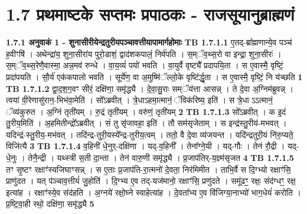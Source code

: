 \documentclass[17pt]{extarticle}
\begin{document}
     \section*{ 1.7     प्रथमाष्टके सप्तमः प्रपाठकः - राजसूयानुब्राह्मणं }
                \textbf{ 1.7.1     अनुवाकं   1 - शुनासीरीयेन्द्रतुरीयपञ्चावत्तीयापामार्गहोमाः} \newline
                                \textbf{ TB 1.7.1.1} \newline
                  ए॒तद्-ब्रा᳚ह्मणान्ये॒व पञ्च॑ ह॒वीꣳषि॑ । अथेन्द्रा॑य॒ शुना॒सीरा॑य पुरो॒डाशं॒ द्वाद॑शकपालं॒ निर्व॑पति । स॒म्ॅव॒थ्स॒रो वा इन्द्रा॒ शुना॒सीरः॑ । स॒म्ॅव॒थ्स॒रेणै॒वास्मा॒ अन्न॒मव॑ रुन्धे । वा॒य॒व्यं॑ पयो॑ भवति । वा॒युर्वै वृष्ट्यै᳚ प्रदापयि॒ता । स ए॒वास्मै॒ वृष्टिं॒ प्रदा॑पयति । सौ॒र्य॑ एक॑कपालो भवति । सूर्ये॑ण॒ वा अ॒मुष्मि॑ॅल्लो॒के वृष्टि॑र्द्धृ॒ता । स ए॒वास्मै॒ वृष्टिं॒ नि य॑च्छति \textbf{ 1} \newline
                  \newline
                                \textbf{ TB 1.7.1.2} \newline
                  द्वा॒द॒श॒ग॒वꣳ सीरं॒ दक्षि॑णा॒ समृ॑द्ध्यै । दे॒वा॒सु॒राः सम्ॅय॑त्ता आसन्न् । ते दे॒वा अ॒ग्निम॑ब्रुवन्न् । त्वया॑ वी॒रेणासु॑रान॒-भिभ॑वा॒मेति॑ । सो᳚ऽब्रवीत् । त्रे॒धाऽहमा॒त्मानं॒ ॅविक॑रिष्य॒ इति॑ । स त्रे॒धा ऽऽत्मानं॒ ॅव्य॑कुरुत । अ॒ग्निं तृती॑यम् । रु॒द्रं तृती॑यम् । वरु॑णं॒ तृती॑यम् \textbf{ 2} \newline
                  \newline
                                \textbf{ TB 1.7.1.3} \newline
                  सो᳚ऽब्रवीत् । क इ॒दं तु॒रीय॒मिति॑ । अ॒हमितीन्द्रो᳚ऽब्रवीत् । सं तु सृ॑जावहा॒ इति॑ । तौ सम॑सृजेताम् । स इन्द्र॑स्तु॒रीय॑-मभवत् । यदिन्द्र॑-स्तु॒रीय॒-मभ॑वत् । तदि॑न्द्र-तुरी॒यस्ये᳚न्द्र-तुरीय॒त्वम् । ततो॒ वै दे॒वा व्य॑जयन्त । यदि॑न्द्रतुरी॒यं नि॑रु॒प्यते॒ विजि॑त्यै \textbf{ 3} \newline
                  \newline
                                \textbf{ TB 1.7.1.4} \newline
                  व॒हिनी॑ धे॒नुर्-दक्षि॑णा । यद्-व॒हिनी᳚ । तेना᳚ग्ने॒यी । यद्-गौः । तेन॑ रौ॒द्री । यद्-धे॒नुः । तेनै॒न्द्री । यथ्स्त्री स॒ती दा॒न्ता । तेन॑ वारु॒णी समृ॑द्ध्यै । प्र॒जाप॑तिर्-य॒ज्ञ्म॑सृजत \textbf{ 4} \newline
                  \newline
                                \textbf{ TB 1.7.1.5} \newline
                  तꣳ सृ॒ष्टꣳ रक्षाꣳ॑स्यजिघाꣳसन्न् । स ए॒ताः प्र॒जाप॑ति-रा॒त्मनो॑ दे॒वता॒ निर॑मिमीत । ताभि॒र्वै स दि॒ग्भ्यो रक्षाꣳ॑सि॒ प्राणु॑दत । यत् प॑ञ्चाव॒त्तीयं॑ जु॒होति॑ । दि॒ग्भ्य ए॒व तद्-यज॑मानो॒ रक्षाꣳ॑सि॒ प्रणु॑दते । समू॑ढꣳ॒॒ रक्षः॒ संद॑ग्धꣳ॒॒ रक्ष॒ इत्या॑ह । रक्षाꣳ॑स्ये॒व संद॑हति । अ॒ग्नये॑ रक्षो॒घ्ने स्वाहेत्या॑ह । दे॒वता᳚भ्य ए॒व वि॑जिग्या॒नाभ्यो॑ भाग॒धेयं॑ करोति । प्र॒ष्टि॒वा॒ही रथो॒ दक्षि॑णा॒ समृ॑द्ध्यै \textbf{ 5} \newline
\end{document}
